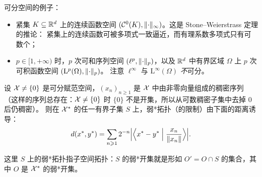 \begin{example}
\label{exa:29}
可分空间的例子：
\begin{itemize}
  \item 紧集 $K\subseteq\mathbb{R}^d$ 上的连续函数空间 $(\mathcal{C}^0(K),\lVert \cdot\rVert_\infty)$。这是 Stone--Weierstrass 定理的推论：
  紧集上的连续函数可被多项式一致逼近，而有理系数多项式只有可数个；
  \item $p\in[1,+\infty)$ 时，$p$ 次可和序列空间 $(\ell^p,\lVert \cdot\rVert_p)$，以及 $\mathbb{R}^d$ 中有界区域 $\Omega$ 上 $p$ 次可积函数空间 $(\mathrm{L}^p(\Omega),\lVert \cdot\rVert_p)$。
  注意 $\ell^\infty$ 与 $\mathrm{L}^\infty(\Omega)$ \emph{不}可分。
\end{itemize}
\end{example}

\begin{theorem}[对偶空间中有界集的可度量化]
\label{res:76}
设 $\mathcal{X}\neq\{0\}$ 是可分赋范空间，$(x_n)_{n\geqslant1}$ 是 $\mathcal{X}$ 中由非零向量组成的稠密序列
（这样的序列总存在：$\mathcal{X}\neq\{0\}$ 时 $\{0\}$ 不是开集，所以从可数稠密子集中去掉 $0$ 后仍稠密）。
则在 $\mathcal{X}^{*}$ 的任一有界子集 $S$ 上，弱*拓扑（的限制）由下面的距离诱导：
\[
  d(x^*,y^*)=\sum_{n\geqslant1}2^{-n}\Bigl|\Bigl\langle x^*-y^*\Bigm|\frac{x_n}{\lVert x_n\rVert}\Bigr\rangle\Bigr| .
\]
\end{theorem}

\begin{remark}
\label{rem:32}
这里 $S$ 上的弱*拓扑指子空间拓扑：$S$ 的弱*开集就是形如 $O'=O\cap S$ 的集合，其中 $O$ 是 $\mathcal{X}^{*}$ 的弱*开集。
\end{remark}

